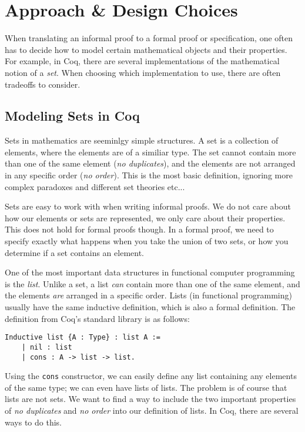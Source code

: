 \chapter{Approach \& Design Choices}

When translating an informal proof to a formal proof or specification,
one often has to decide how to model certain mathematical objects and their properties.
For example, in Coq, there are several implementations of the mathematical notion of a \textit{set}.
When choosing which implementation to use, there are often tradeoffs to consider.

\section{Modeling Sets in Coq}

Sets in mathematics are seeminlgy simple structures.
A set is a collection of elements, where the elements are of a similiar type.
The set cannot contain more than one of the same element (\textit{no duplicates}), and the elements are not arranged in any
specific order (\textit{no order}). This is the most basic definition, ignoring more complex paradoxes and different set theories etc...

Sets are easy to work with when writing informal proofs.
We do not care about how our elements or sets are represented, we only care about their properties.
This does not hold for formal proofs though. In a formal proof, we need to specify exactly what happens
when you take the union of two sets, or how you determine if a set contains an element.

One of the most important data structures in functional computer programming is the \textit{list}.
Unlike a set, a list \textit{can} contain more than one of the same element, and the elements \textit{are} arranged in a
specific order.
Lists (in functional programming) usually have the same inductive definition, which is also a formal definition.
The definition from Coq's standard library is as follows:

\begin{minipage}{\linewidth}
\begin{lstlisting}[language=Coq, label={lst:list_def}, caption={Def. of a list in Coq}]
Inductive list {A : Type} : list A :=
    | nil : list
    | cons : A -> list -> list.
\end{lstlisting}
\end{minipage}

Using the \lstinline{cons} constructor, we can easily define any list containing any elements of the same type;
we can even have lists of lists.
The problem is of course that lists are not sets. We want to find a way to include the two important properties
of \textit{no duplicates} and \textit{no order} into our definition of lists.
In Coq, there are several ways to do this.

